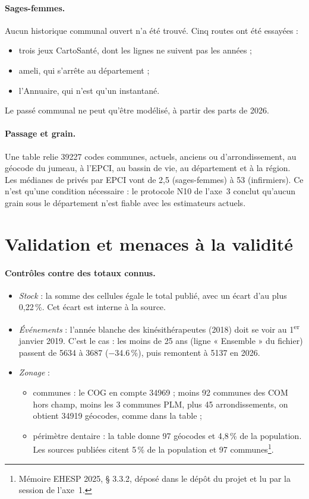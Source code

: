 \paragraph{Sages-femmes.} Aucun historique communal ouvert n'a été trouvé. Cinq routes ont été essayées :
\begin{itemize}
  \item trois jeux CartoSanté, dont les lignes ne suivent pas les années ;
  \item ameli, qui s'arrête au département ;
  \item l'Annuaire, qui n'est qu'un instantané.
\end{itemize}
Le passé communal ne peut qu'être modélisé, à partir des parts de 2026.

\paragraph{Passage et grain.} Une table relie \num{39227} codes communes, actuels, anciens ou d'arrondissement,
au géocode du jumeau, à l'EPCI, au bassin de vie, au département et à la région. Les médianes de privés par EPCI
vont de 2,5 (sages-femmes) à 53 (infirmiers)\mesure{}. Ce n'est qu'une condition nécessaire : le protocole N10
de l'axe~3 conclut qu'aucun grain sous le département n'est fiable avec les estimateurs actuels.

\section{Validation et menaces à la validité}\label{a4-sec:menaces}
\paragraph{Contrôles contre des totaux connus.}
\begin{itemize}
  \item \emph{Stock} : la somme des cellules égale le total publié, avec un écart d'au plus 0,22\,\%\mesure{}.
  Cet écart est interne à la source.
  \item \emph{Événements} : l'année blanche des kinésithérapeutes (2018) doit se voir au 1\textsuperscript{er}
  janvier 2019. C'est le cas : les moins de 25 ans (ligne « Ensemble » du fichier) passent de \num{5634} à \num{3687}
  (\num{-34.6}\,\%), puis remontent à \num{5137} en 2026\mesure{}.
  \item \emph{Zonage} :
  \begin{itemize}
    \item communes : le COG en compte \num{34969} ; moins 92 communes des COM hors champ, moins les 3 communes
    PLM, plus 45 arrondissements, on obtient \num{34919} géocodes, comme dans la table\mesure{} ;
    \item périmètre dentaire : la table donne 97 géocodes et 4,8\,\% de la population\mesure{}. Les sources
    publiées citent 5\,\% de la population \citep{a4-arspaca2025cd} et 97 communes\footnote{Mémoire EHESP 2025,
    § 3.3.2, déposé dans le dépôt du projet et lu par la session de l'axe~1.}.
  \end{itemize}
\end{itemize}

